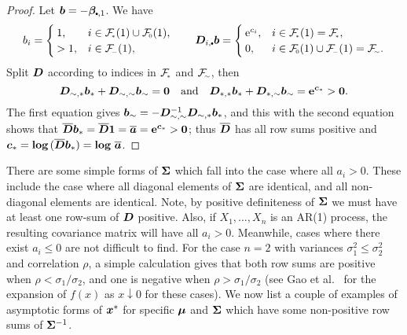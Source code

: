 \begin{proof}
Let $\bfb = -\bfbeta_{\sbullet,1}$. We have
\[
	b_i = \begin{cases}
		1, & i \in \Fset{*}(1) \cup \Fset{0}(1), \\
		>1, & i \in \Fset{-}(1),
	\end{cases}
	\qquad
	\bfD_{i,\sbullet} \bfb = \begin{cases}
		\e^{c_i}, & i \in \Fset{*}(1) = \Fset{*}, \\
		0, & i \in \Fset{0}(1) \cup \Fset{-}(1) = \Fset{\sim}.
	\end{cases}
\]
Split $\bm{D}$ according to indices in $\Fset{*}$ and $\Fset{\sim}$, then
\[ \bm{D}_{{\sim},{*}} \bm{b}_{*} + \bm{D}_{{\sim},{\sim}} \bm{b}_{\sim} = \bm{0}
\quad \text{and}
 \quad \bm{D}_{{*},{*}} \bm{b}_{*} + \bm{D}_{{*},{\sim}} \bm{b}_{\sim}  =
 \text{\bf{e}}^{\bm{c}_{*}}  > \bm{0}. \]
The first equation gives $\bm{b}_{{\sim}} =  - \bm{D}_{{\sim},{\sim}}^{-1}
\bm{D}_{{\sim},{*}} \bm{b}_{*}$, and this with the second equation shows
that
$ \overline{\bm{D}} \bm{b}_{*} = \overline{\bm{D}} \bm{1} = \overline{\bm{a}} =
\text{\bf{e}}^{\bm{c}_{*}} > \bm{0} $;
thus $\overline{\bm{D}}$ has all row sums positive and
$\bm{c}_{*} = \text{\bf{log}}\,(\overline{\bm{D}}\bm{b}_{*}) = \text{\bf{log}}\,\,\overline{\bm{a}}$.
\end{proof}

There are some simple forms of $\bm{\Sigma}$ which fall into the case where all
$a_i > 0$. These include the case where all diagonal elements of $\bm{\Sigma}$
are identical, and all non-diagonal elements are identical. Note, by positive
definiteness of $\bm{\Sigma}$ we must have at least one row-sum of $\bm{D}$ positive. Also,
if $X_1, \dots, X_n$ is an AR(1) process, the resulting covariance matrix
will have all $a_i > 0$. Meanwhile, cases where there exist  $a_i \leq 0$ are
not difficult to find. For the case $n=2$ with variances $\sigma_1^2 \leq
\sigma_2^2$ and correlation $\rho$, a simple calculation gives that both row
sums are positive when $\rho < \sigma_1 / \sigma_2$, and one is negative when
$\rho > \sigma_1 / \sigma_2$ (see Gao et al.\ \cite{gao2009asymptotic} for the
expansion of $f(x)$ as $x \downarrow 0$ for these cases). We now list a couple
of examples of asymptotic forms of $\bm{x}^*$ for specific $\bm{\mu}$ and
$\bm{\Sigma}$ which have some non-positive row sums of $\bm{\Sigma}^{-1}$.

